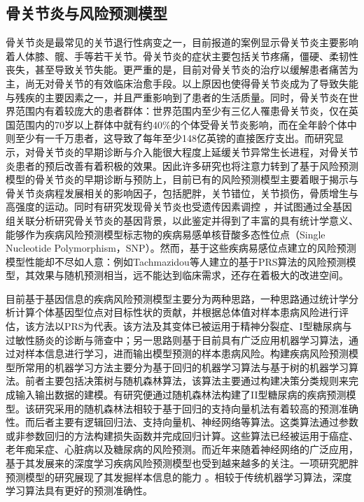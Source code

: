 \subsection{骨关节炎与风险预测模型}
骨关节炎是最常见的关节退行性病变之一，目前报道的案例显示骨关节炎主要影响着人体膝、髋、手等若干关节。骨关节炎的症状主要包括关节疼痛，僵硬、柔韧性丧失，甚至导致关节失能。更严重的是，目前对骨关节炎的治疗以缓解患者痛苦为主，尚无对骨关节的有效临床治愈手段。以上原因也使得骨关节炎成为了导致失能与残疾的主要因素之一，并且严重影响到了患者的生活质量\cite{martel-pelletier_osteoarthritis_2016}。同时，骨关节炎在世界范围内有着较庞大的患者群体：世界范围内至少有三亿人罹患骨关节炎\cite{james_global_2018}，仅在英国范围内的70岁以上群体中就有约40\%的个体受骨关节炎影响\cite{vos_years_2012}，而在全年龄个体中则至少有一千万患者，这导致了每年至少148亿英镑的直接医疗支出\cite{hiligsmann_health_2013}。而研究显示，对骨关节炎的早期诊断与介入能很大程度上延缓关节异常生长进程，对骨关节炎患者的预后改善有着积极的效果\cite{martel-pelletier_osteoarthritis_2016}。因此许多研究也将注意力转到了基于风险预测模型的骨关节炎的早期诊断与预防上，目前已有的风险预测模型主要着眼于揭示与骨关节炎病程发展相关的影响因子，包括肥胖，关节错位，关节损伤，骨质增生与高强度的运动\cite{cooper_risk_2000,zhang_methodologic_2010,veronese_osteoarthritis_2016}。同时有研究发现骨关节炎也受遗传因素调控\cite{styrkarsdottir_meta-analysis_2018} ，并试图通过全基因组关联分析研究骨关节炎的基因背景，以此鉴定并得到了丰富的具有统计学意义、能够作为疾病风险预测模型标志物的疾病易感单核苷酸多态性位点（Single Nucleotide Polymorphism，SNP）\cite{arcogen_consortium_identification_2019,zengini_genome-wide_2018}。然而，基于这些疾病易感位点建立的风险预测模型性能却不尽如人意：例如Tachmazidou\cite{arcogen_consortium_identification_2019}等人建立的基于PRS算法的风险预测模型，其效果与随机预测相当，远不能达到临床需求，还存在着极大的改进空间。

目前基于基因信息的疾病风险预测模型主要分为两种思路，一种思路通过统计学分析计算个体基因型位点对目标性状的贡献，并根据总体值对样本患病风险进行评估，该方法以PRS为代表\cite{choi_tutorial:_2020}。该方法及其变体已被运用于精神分裂症、I型糖尿病与过敏性肠炎的诊断与筛查中\cite{jostins_genetic_2011,wray_research_2014,so_exploring_2017}；另一思路则基于目前具有广泛应用机器学习算法，通过对样本信息进行学习，进而输出模型预测的样本患病风险。构建疾病风险预测模型所常用的机器学习方法主要分为基于回归的机器学习算法与基于树的机器学习算法。前者主要包括决策树与随机森林算法，该算法主要通过构建决策分类规则来完成输入输出数据的建模。有研究便通过随机森林法构建了II型糖尿病的疾病预测模型\cite{lopez_single_2018}。该研究采用的随机森林法相较于基于回归的支持向量机法有着较高的预测准确性。而后者主要有逻辑回归法、支持向量机、神经网络等算法。这类算法通过参数或非参数回归的方法构建损失函数并完成回归计算。这些算法已经被运用于癌症、老年痴呆症、心脏病以及糖尿病的风险预测\cite{capriotti_predicting_2006,cruz_applications_2006,palaniappan_intelligent_2008,yu_application_2010,zhang_multi-modal_2012}。而近年来随着神经网络的广泛应用，基于其发展来的深度学习疾病风险预测模型也受到越来越多的关注。一项研究肥胖预测模型的研究展现了其发掘样本信息的能力 \cite{montanez_deep_2018}。相较于传统机器学习算法，深度学习算法具有更好的预测准确性。


